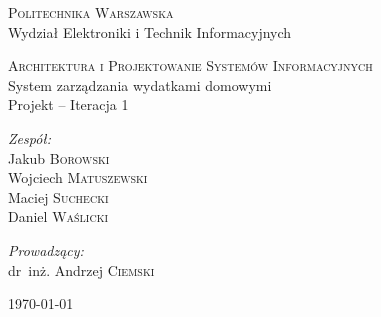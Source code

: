 \documentclass[parindent=0pt,11pt,a4paper]{article}
\begin{document}
\begin{titlepage}
  \begin{center}

    \textsc{\Large Politechnika Warszawska}\\[0.1cm]
    \small Wydział Elektroniki i Technik Informacyjnych
    \vfill

    \textsc{\small Architektura i Projektowanie Systemów Informacyjnych}\\[0.1cm]
    \Huge System zarządzania wydatkami domowymi\\[1.5cm]
    \small Projekt -- Iteracja 1\\[2.5cm]

    \vfill

    \begin{minipage}{0.4\textwidth}
      \begin{flushleft} \large
        \emph{Zespół:}\\[0.1cm]
        Jakub \textsc{Borowski}\\
        Wojciech \textsc{Matuszewski}\\
        Maciej \textsc{Suchecki}\\
        Daniel \textsc{Waślicki}\\
      \end{flushleft}
    \end{minipage}
    \begin{minipage}{0.4\textwidth}
      \begin{flushright} \large
        \emph{Prowadzący:}\\[0.1cm]
        dr~inż. Andrzej \textsc{Ciemski}\\[1cm]
      \end{flushright}
    \end{minipage}

    \vfill
    {\large \today}

  \end{center}
\end{titlepage}

\newpage
\tableofcontents

\newpage

\newpage

\newpage

%
%
%
\end{document}
